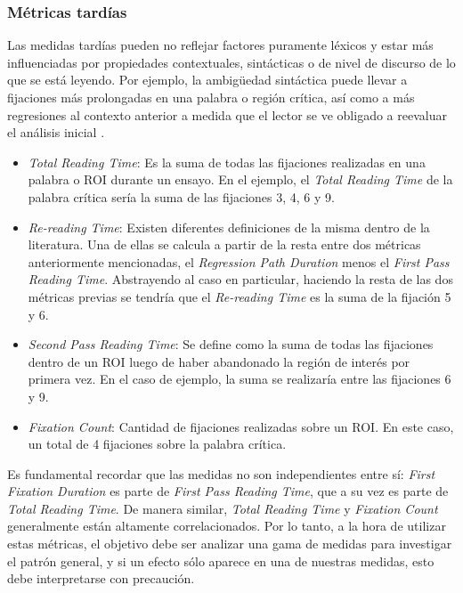 \subsubsection{Métricas tardías}

Las medidas tardías pueden no reflejar factores puramente léxicos y estar más influenciadas por propiedades contextuales, sintácticas o de nivel de discurso de lo que se está leyendo. Por ejemplo, la ambigüedad sintáctica puede llevar a fijaciones más prolongadas en una palabra o región crítica, así como a más regresiones al contexto anterior a medida que el lector se ve obligado a reevaluar el análisis inicial \parencite{FrazierRayner1982}.

\begin{itemize}
    \item \textit{Total Reading Time}: Es la suma de todas las fijaciones realizadas en una palabra o ROI durante un ensayo. En el ejemplo, el \textit{Total Reading Time} de la palabra crítica sería la suma de las fijaciones 3, 4, 6 y 9.
    \item \textit{Re-reading Time}: Existen diferentes definiciones de la misma dentro de la literatura. Una de ellas se calcula a partir de la resta entre dos métricas anteriormente mencionadas, el \textit{Regression Path Duration} menos el \textit{First Pass Reading Time}. Abstrayendo al caso en particular, haciendo la resta de las dos métricas previas se tendría que el \textit{Re-reading Time} es la suma de la fijación 5 y 6.
    \item \textit{Second Pass Reading Time}: Se define como la suma de todas las fijaciones dentro de un ROI luego de haber abandonado la región de interés por primera vez. En el caso de ejemplo, la suma se realizaría entre las fijaciones 6 y 9.
    \item \textit{Fixation Count}: Cantidad de fijaciones realizadas sobre un ROI. En este caso, un total de 4 fijaciones sobre la palabra crítica.
\end{itemize}

Es fundamental recordar que las medidas no son independientes entre sí: \textit{First Fixation Duration} es parte de \textit{First Pass Reading Time}, que a su vez es parte de \textit{Total Reading Time}. De manera similar, \textit{Total Reading Time} y \textit{Fixation Count} generalmente están altamente correlacionados. Por lo tanto, a la hora de utilizar estas métricas, el objetivo debe ser analizar una gama de medidas para investigar el patrón general, y si un efecto sólo aparece en una de nuestras medidas, esto debe interpretarse con precaución.

